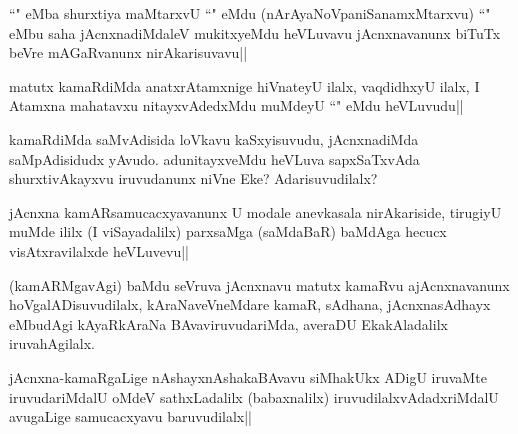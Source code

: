 
\begin{artha}
``\stext" eMba shurxtiya maMtarxvU ``\stext" eMdu (nArAyaNoVpaniSanamxMtarxvu) ``\stext" eMbu saha jAcnxnadiMdaleV mukitxyeMdu heVLuvavu jAcnxnavanunx biTuTx beVre mAGaRvanunx nirAkarisuvavu||
\end{artha}


\begin{artha}
matutx kamaRdiMda anatxrAtamxnige hiVnateyU ilalx, vaqdidhxyU ilalx, I Atamxna mahatavxu nitayxvAdedxMdu muMdeyU ``\stext" eMdu heVLuvudu||
\end{artha}


\begin{artha}
kamaRdiMda saMvAdisida loVkavu kaSxyisuvudu, jAcnxnadiMda saMpAdisidudx yAvudo. 
adunitayxveMdu heVLuva sapxSaTxvAda shurxtivAkayxvu iruvudanunx niVne Eke? Adarisuvudilalx?
\end{artha}

\begin{artha}
jAcnxna kamARsamucacxyavanunx U modale anevkasala nirAkariside, tirugiyU muMde ililx (I viSayadalilx) parxsaMga (saMdaBaR) baMdAga hecucx visAtxravilalxde heVLuvevu||
\end{artha}


\begin{artha}
(kamARMgavAgi) baMdu seVruva jAcnxnavu matutx kamaRvu ajAcnxnavanunx hoVgalADisuvudilalx, kAraNaveVneMdare kamaR, sAdhana, jAcnxnasAdhayx eMbudAgi kAyaRkAraNa BAvaviruvudariMda, averaDU EkakAladalilx iruvahAgilalx.
\end{artha}



\begin{artha}
jAcnxna-kamaRgaLige nAshayxnAshakaBAvavu siMhakUkx ADigU iruvaMte iruvudariMdalU oMdeV sathxLadalilx (babaxnalilx) iruvudilalxvAdadxriMdalU avugaLige samucacxyavu baruvudilalx||
\end{artha}

